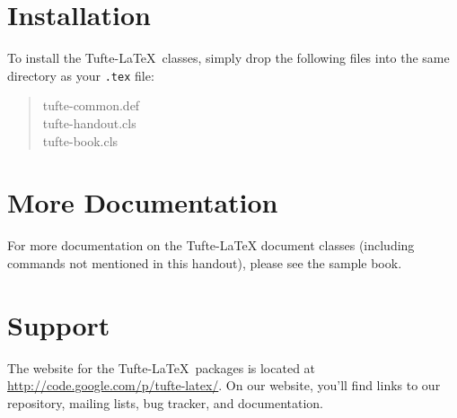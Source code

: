 \documentclass{tufte-handout}
\begin{document}
\section{Installation}\label{sec:installation}
To install the Tufte-\LaTeX\ classes, simply drop the
following files into the same directory as your \texttt{.tex}
file:
\begin{quote}
  \ttfamily
  tufte-common.def\\
  tufte-handout.cls\\
  tufte-book.cls
\end{quote}




\section{More Documentation}\label{sec:more-doc}
For more documentation on the Tufte-\LaTeX{} document classes (including commands not
mentioned in this handout), please see the sample book.

\section{Support}\label{sec:support}

The website for the Tufte-\LaTeX\ packages is located at
\url{http://code.google.com/p/tufte-latex/}.  On our website, you'll find
links to our  repository, mailing lists, bug tracker, and documentation.

%
%
\end{document}
